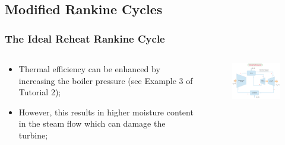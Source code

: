 \documentclass[10pt,compress]{beamer}
\begin{document}

\subsection{Modified Rankine Cycles}
\begin{frame}
 \frametitle{The Ideal Reheat Rankine Cycle}
  \begin{columns}
   \begin{column}[c]{0.5\linewidth}

 \begin{itemize} %
  \item <1-> Thermal efficiency can be enhanced by increasing the boiler pressure (see Example 3 of Tutorial 2);
  \item <2-> However, this results in higher moisture content in the steam flow which can damage the turbine;
 \end{itemize}
   \end{column}

   \begin{column}[c]{0.5\linewidth} 
    \begin{figure}%
     \begin{center}
      \includegraphics[width=6.25cm,clip]{./Pics/Reheat_Rankine_Cycle}
     \end{center}
    \end{figure}  
   \end{column}
  \end{columns}
 \normalsize
\end{frame}
\end{document}
